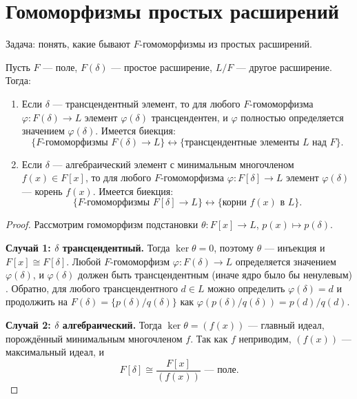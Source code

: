\section{Гомоморфизмы простых расширений}

Задача: понять, какие бывают $F$-гомоморфизмы из простых расширений.

\begin{stmt}
    Пусть $F$ --- поле, $F(\delta)$ --- простое расширение, $L/F$ --- другое расширение. Тогда:

    \begin{enumerate}
        \item Если $\delta$ --- трансцендентный элемент, то для любого $F$-гомоморфизма $\varphi\colon F(\delta)
        \to L$ элемент $\varphi(\delta)$ трансцендентен, и $\varphi$ полностью определяется значением
        $\varphi(\delta)$. Имеется биекция:
        \[
            \{F\text{-гомоморфизмы } F(\delta) \to L\} \longleftrightarrow \{\text{трансцендентные элементы }
            L \text{ над } F\}.
        \]

        \item Если $\delta$ --- алгебраический элемент с минимальным многочленом $f(x) \in F[x]$, то для любого
        $F$-гомоморфизма $\varphi\colon F[\delta] \to L$ элемент $\varphi(\delta)$ --- корень $f(x)$.
        Имеется биекция:
        \[
            \{F\text{-гомоморфизмы } F[\delta] \to L\} \longleftrightarrow \{\text{корни } f(x) \text{ в }
            L\}.
        \]
    \end{enumerate}

    \begin{proof}
        Рассмотрим гомоморфизм подстановки $\theta\colon F[x] \to L$, $p(x) \mapsto p(\delta)$.

        \textbf{Случай 1: $\delta$ трансцендентный.} Тогда $\ker\theta = 0$, поэтому $\theta$ --- инъекция и
        $F[x] \cong F[\delta]$. Любой $F$-гомоморфизм $\varphi\colon F(\delta) \to L$ определяется значением
        $\varphi(\delta)$, и $\varphi(\delta)$ должен быть трансцендентным (иначе ядро было бы ненулевым)
        . Обратно, для любого трансцендентного $d \in L$ можно определить $\varphi(\delta) = d$ и продолжить на
        $F(\delta) = \{p(\delta)/q(\delta)\}$ как $\varphi(p(\delta)/q(\delta)) = p(d)/q(d)$.

        \textbf{Случай 2: $\delta$ алгебраический.} Тогда $\ker\theta = (f(x))$ --- главный идеал, порождённый минимальным многочленом
        $f$. Так как $f$ неприводим, $(f(x))$ --- максимальный идеал, и
        \[
            F[\delta] \cong \frac{F[x]}{(f(x))} \text{ --- поле.}
        \]


\end{proof}
\end{stmt}
